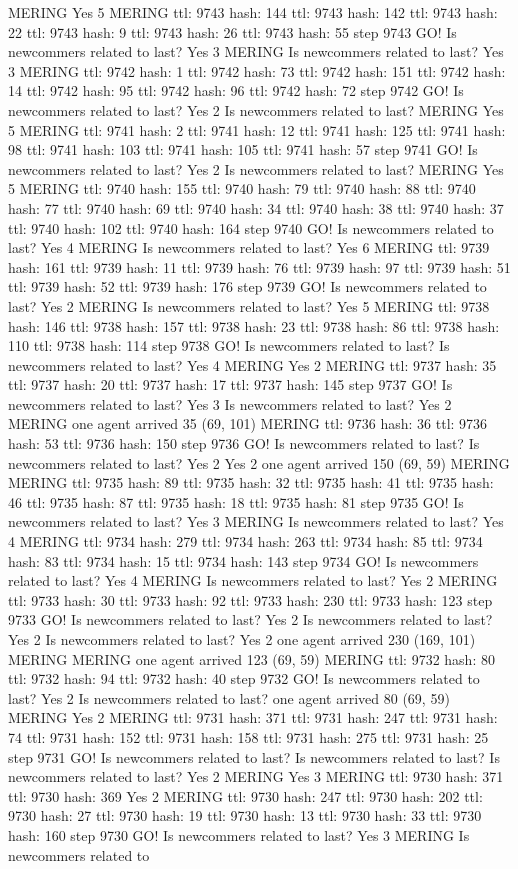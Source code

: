 MERING Yes 5 MERING ttl: 9743 hash: 144 ttl: 9743 hash: 142 ttl: 9743 hash: 22 ttl: 9743 hash: 9 ttl: 9743 hash: 26 ttl: 9743 hash: 55 step 9743 GO! Is newcommers related to last? Yes 3 MERING Is newcommers related to last? Yes 3 MERING ttl: 9742 hash: 1 ttl: 9742 hash: 73 ttl: 9742 hash: 151 ttl: 9742 hash: 14 ttl: 9742 hash: 95 ttl: 9742 hash: 96 ttl: 9742 hash: 72 step 9742 GO! Is newcommers related to last? Yes 2 Is newcommers related to last? MERING Yes 5 MERING ttl: 9741 hash: 2 ttl: 9741 hash: 12 ttl: 9741 hash: 125 ttl: 9741 hash: 98 ttl: 9741 hash: 103 ttl: 9741 hash: 105 ttl: 9741 hash: 57 step 9741 GO! Is newcommers related to last? Yes 2 Is newcommers related to last? MERING Yes 5 MERING ttl: 9740 hash: 155 ttl: 9740 hash: 79 ttl: 9740 hash: 88 ttl: 9740 hash: 77 ttl: 9740 hash: 69 ttl: 9740 hash: 34 ttl: 9740 hash: 38 ttl: 9740 hash: 37 ttl: 9740 hash: 102 ttl: 9740 hash: 164 step 9740 GO! Is newcommers related to last? Yes 4 MERING Is newcommers related to last? Yes 6 MERING ttl: 9739 hash: 161 ttl: 9739 hash: 11 ttl: 9739 hash: 76 ttl: 9739 hash: 97 ttl: 9739 hash: 51 ttl: 9739 hash: 52 ttl: 9739 hash: 176 step 9739 GO! Is newcommers related to last? Yes 2 MERING Is newcommers related to last? Yes 5 MERING ttl: 9738 hash: 146 ttl: 9738 hash: 157 ttl: 9738 hash: 23 ttl: 9738 hash: 86 ttl: 9738 hash: 110 ttl: 9738 hash: 114 step 9738 GO! Is newcommers related to last? Is newcommers related to last? Yes 4 MERING Yes 2 MERING ttl: 9737 hash: 35 ttl: 9737 hash: 20 ttl: 9737 hash: 17 ttl: 9737 hash: 145 step 9737 GO! Is newcommers related to last? Yes 3 Is newcommers related to last? Yes 2 MERING one agent arrived 35 (69, 101) MERING ttl: 9736 hash: 36 ttl: 9736 hash: 53 ttl: 9736 hash: 150 step 9736 GO! Is newcommers related to last? Is newcommers related to last? Yes 2 Yes 2 one agent arrived 150 (69, 59) MERING MERING ttl: 9735 hash: 89 ttl: 9735 hash: 32 ttl: 9735 hash: 41 ttl: 9735 hash: 46 ttl: 9735 hash: 87 ttl: 9735 hash: 18 ttl: 9735 hash: 81 step 9735 GO! Is newcommers related to last? Yes 3 MERING Is newcommers related to last? Yes 4 MERING ttl: 9734 hash: 279 ttl: 9734 hash: 263 ttl: 9734 hash: 85 ttl: 9734 hash: 83 ttl: 9734 hash: 15 ttl: 9734 hash: 143 step 9734 GO! Is newcommers related to last? Yes 4 MERING Is newcommers related to last? Yes 2 MERING ttl: 9733 hash: 30 ttl: 9733 hash: 92 ttl: 9733 hash: 230 ttl: 9733 hash: 123 step 9733 GO! Is newcommers related to last? Yes 2 Is newcommers related to last? Yes 2 Is newcommers related to last? Yes 2 one agent arrived 230 (169, 101) MERING MERING one agent arrived 123 (69, 59) MERING ttl: 9732 hash: 80 ttl: 9732 hash: 94 ttl: 9732 hash: 40 step 9732 GO! Is newcommers related to last? Yes 2 Is newcommers related to last? one agent arrived 80 (69, 59) MERING Yes 2 MERING ttl: 9731 hash: 371 ttl: 9731 hash: 247 ttl: 9731 hash: 74 ttl: 9731 hash: 152 ttl: 9731 hash: 158 ttl: 9731 hash: 275 ttl: 9731 hash: 25 step 9731 GO! Is newcommers related to last? Is newcommers related to last? Is newcommers related to last? Yes 2 MERING Yes 3 MERING ttl: 9730 hash: 371 ttl: 9730 hash: 369 Yes 2 MERING ttl: 9730 hash: 247 ttl: 9730 hash: 202 ttl: 9730 hash: 27 ttl: 9730 hash: 19 ttl: 9730 hash: 13 ttl: 9730 hash: 33 ttl: 9730 hash: 160 step 9730 GO! Is newcommers related to last? Yes 3 MERING Is newcommers related to 